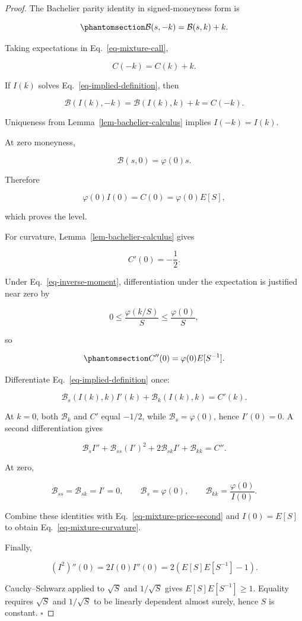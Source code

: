 \documentclass[
  english,
  11pt,
  letterpaper,
  DIV=11,
  numbers=noendperiod]{scrartcl}
\theoremstyle{plain}
\theoremstyle{plain}
\theoremstyle{plain}
\theoremstyle{plain}
\theoremstyle{remark}
\begin{document}
\begin{proof}
The Bachelier parity identity in signed-moneyness form is

\begin{equation}\protect\phantomsection\label{eq-bachelier-parity}{
\mathcal B(s,-k)=\mathcal B(s,k)+k.
}\end{equation}

Taking expectations in Eq.~\ref{eq-mixture-call},

\[
C(-k)=C(k)+k.
\]

If \(I(k)\) solves Eq.~\ref{eq-implied-definition}, then

\[
\mathcal B(I(k),-k)
=\mathcal B(I(k),k)+k
=C(-k).
\]

Uniqueness from Lemma~\ref{lem-bachelier-calculus} implies
\(I(-k)=I(k)\).

At zero moneyness,

\[
\mathcal B(s,0)=\varphi(0)s.
\]

Therefore

\[
\varphi(0)I(0)
=C(0)
=\varphi(0)E[S],
\]

which proves the level.

For curvature, Lemma~\ref{lem-bachelier-calculus} gives

\[
C'(0)=-\frac12.
\]

Under Eq.~\ref{eq-inverse-moment}, differentiation under the expectation
is justified near zero by

\[
0\le
\frac{\varphi(k/S)}{S}
\le
\frac{\varphi(0)}{S},
\]

so

\begin{equation}\protect\phantomsection\label{eq-mixture-price-second}{
C''(0)=\varphi(0)E[S^{-1}].
}\end{equation}

Differentiate Eq.~\ref{eq-implied-definition} once:

\[
\mathcal B_s(I(k),k)I'(k)
+\mathcal B_k(I(k),k)
=C'(k).
\]

At \(k=0\), both \(\mathcal B_k\) and \(C'\) equal \(-1/2\), while
\(\mathcal B_s=\varphi(0)\), hence \(I'(0)=0\). A second differentiation
gives

\[
\mathcal B_s I''
+\mathcal B_{ss}(I')^2
+2\mathcal B_{sk}I'
+\mathcal B_{kk}
=C''.
\]

At zero,

\[
\mathcal B_{ss}=\mathcal B_{sk}=I'=0,
\qquad
\mathcal B_s=\varphi(0),
\qquad
\mathcal B_{kk}=\frac{\varphi(0)}{I(0)}.
\]

Combine these identities with Eq.~\ref{eq-mixture-price-second} and
\(I(0)=E[S]\) to obtain Eq.~\ref{eq-mixture-curvature}.

Finally,

\[
(I^2)''(0)=2I(0)I''(0)
=2(E[S]E[S^{-1}]-1).
\]

Cauchy--Schwarz applied to \(\sqrt S\) and \(1/\sqrt S\) gives
\(E[S]E[S^{-1}]\ge1\). Equality requires \(\sqrt S\) and \(1/\sqrt S\)
to be linearly dependent almost surely, hence \(S\) is constant.
\(\square\)
\end{proof}
\end{document}
